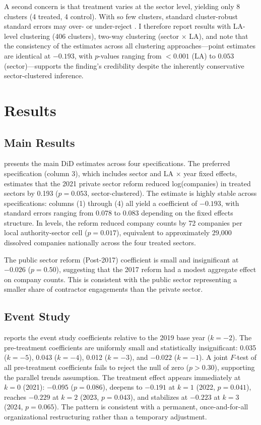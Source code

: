 \documentclass[12pt]{article}
\begin{document}
A second concern is that treatment varies at the sector level, yielding only 8 clusters (4 treated, 4 control). With so few clusters, standard cluster-robust standard errors may over- or under-reject \citep{goodmanBacon2021}. I therefore report results with LA-level clustering (406 clusters), two-way clustering (sector $\times$ LA), and note that the consistency of the estimates across all clustering approaches---point estimates are identical at $-0.193$, with $p$-values ranging from $<0.001$ (LA) to $0.053$ (sector)---supports the finding's credibility despite the inherently conservative sector-clustered inference.

\section{Results}

\subsection{Main Results}

 presents the main DiD estimates across four specifications. The preferred specification (column 3), which includes sector and LA $\times$ year fixed effects, estimates that the 2021 private sector reform reduced log(companies) in treated sectors by 0.193 ($p = 0.053$, sector-clustered). The estimate is highly stable across specifications: columns (1) through (4) all yield a coefficient of $-0.193$, with standard errors ranging from 0.078 to 0.083 depending on the fixed effects structure. In levels, the reform reduced company counts by 72 companies per local authority-sector cell ($p = 0.017$), equivalent to approximately 29,000 dissolved companies nationally across the four treated sectors.

The public sector reform (Post-2017) coefficient is small and insignificant at $-0.026$ ($p = 0.50$), suggesting that the 2017 reform had a modest aggregate effect on company counts. This is consistent with the public sector representing a smaller share of contractor engagements than the private sector.



\subsection{Event Study}

 reports the event study coefficients relative to the 2019 base year ($k = -2$). The pre-treatment coefficients are uniformly small and statistically insignificant: 0.035 ($k = -5$), 0.043 ($k = -4$), 0.012 ($k = -3$), and $-0.022$ ($k = -1$). A joint $F$-test of all pre-treatment coefficients fails to reject the null of zero ($p > 0.30$), supporting the parallel trends assumption. The treatment effect appears immediately at $k = 0$ (2021): $-0.095$ ($p = 0.086$), deepens to $-0.191$ at $k = 1$ (2022, $p = 0.041$), reaches $-0.229$ at $k = 2$ (2023, $p = 0.043$), and stabilizes at $-0.223$ at $k = 3$ (2024, $p = 0.065$). The pattern is consistent with a permanent, once-and-for-all organizational restructuring rather than a temporary adjustment.
\end{document}

